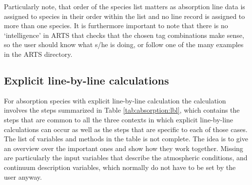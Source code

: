 Particularly note, that order of the species list matters as absorption line
data is assigned to species in their order within the 
list and no line record is assigned to more than one species.
It is furthermore important to note that there is no `intelligence' in ARTS that
checks that the chosen tag combinations make sense, so the user should
know what s/he is doing, or follow one of the many examples in
the ARTS  directory.

\subsection{Explicit line-by-line calculations}

For absorption species with explicit line-by-line calculation the
calculation involves the steps summarized in Table
\ref{tab:absorption:lbl}, which contains the steps that are common to all the
three contexts in which explicit line-by-line calculations can occur as well
as the steps that are specific to each of those cases. 
The list of variables and methods in the
table is not complete. The idea is to give an overview over the
important ones and show how they work together. Missing are
particularly the input variables that describe the atmospheric
conditions, and continuum description variables, which normally do not
have to be set by the user anyway.

